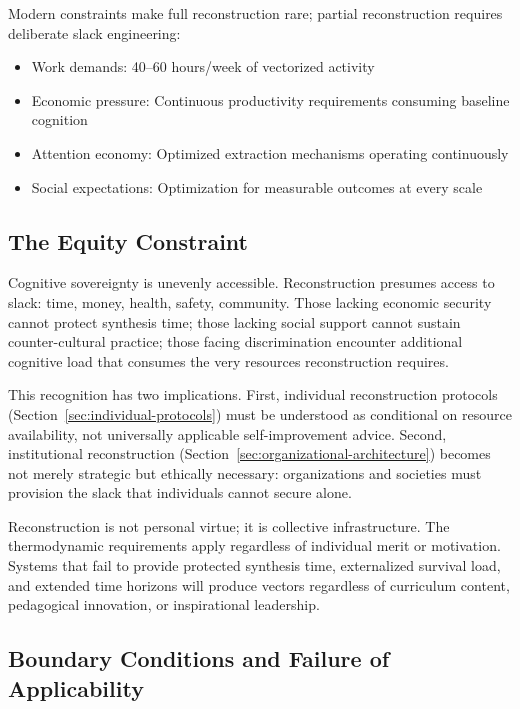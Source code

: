 Modern constraints make full reconstruction rare; partial reconstruction requires deliberate slack engineering:
\begin{itemize}
\item Work demands: 40--60 hours/week of vectorized activity
\item Economic pressure: Continuous productivity requirements consuming baseline cognition
\item Attention economy: Optimized extraction mechanisms operating continuously \citep{zuboff2019}
\item Social expectations: Optimization for measurable outcomes at every scale
\end{itemize}

\subsection{The Equity Constraint}
\label{sec:equity}

Cognitive sovereignty is unevenly accessible. Reconstruction presumes access to slack: time, money, health, safety, community. Those lacking economic security cannot protect synthesis time; those lacking social support cannot sustain counter-cultural practice; those facing discrimination encounter additional cognitive load that consumes the very resources reconstruction requires.

This recognition has two implications. First, individual reconstruction protocols (Section~\ref{sec:individual-protocols}) must be understood as conditional on resource availability, not universally applicable self-improvement advice. Second, institutional reconstruction (Section~\ref{sec:organizational-architecture}) becomes not merely strategic but ethically necessary: organizations and societies must provision the slack that individuals cannot secure alone.

Reconstruction is not personal virtue; it is collective infrastructure. The thermodynamic requirements apply regardless of individual merit or motivation. Systems that fail to provide protected synthesis time, externalized survival load, and extended time horizons will produce vectors regardless of curriculum content, pedagogical innovation, or inspirational leadership.

\subsection{Boundary Conditions and Failure of Applicability}
\label{sec:boundary-conditions}

